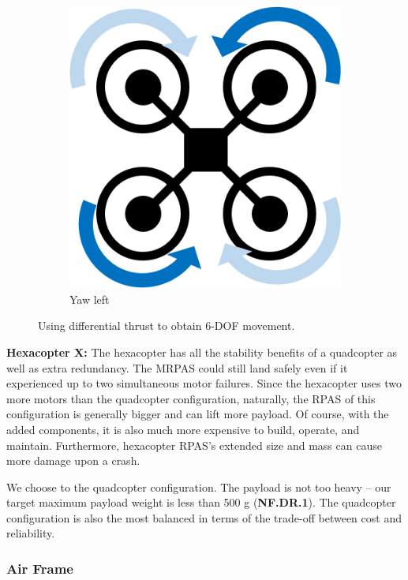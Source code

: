 \begin{figure}[h]
\begin{subfigure}[b]{0.3\textwidth}
    \end{subfigure}
    ~
    \begin{subfigure}[b]{0.3\textwidth}
        \centering
        \includegraphics[scale=0.4]{img/drone_x_yaw}
        \caption{Yaw left}
        \label{fig:x-yaw}
    \end{subfigure}
    
    \caption{Using differential thrust to obtain 6-DOF movement. }
    \label{fig:rpas_6dof}
\end{figure}

\textbf{Hexacopter X:}
The hexacopter has all the stability benefits of a quadcopter as well as extra redundancy. The MRPAS could still land safely even if it experienced up to two simultaneous motor failures. Since the hexacopter uses two more motors than the quadcopter configuration, naturally, the RPAS of this configuration is generally bigger and can lift more payload. Of course, with the added components, it is also much more expensive to build, operate, and maintain. Furthermore, hexacopter RPAS's extended size and mass can cause more damage upon a crash.

We choose to the quadcopter configuration. 
The payload is not too heavy -- our target maximum payload weight is less than 500 g (\textbf{NF.DR.1}). The quadcopter configuration is also the most balanced in terms of the trade-off between cost and reliability. 

\subsubsection{Air Frame}\label{section:air-frame}

